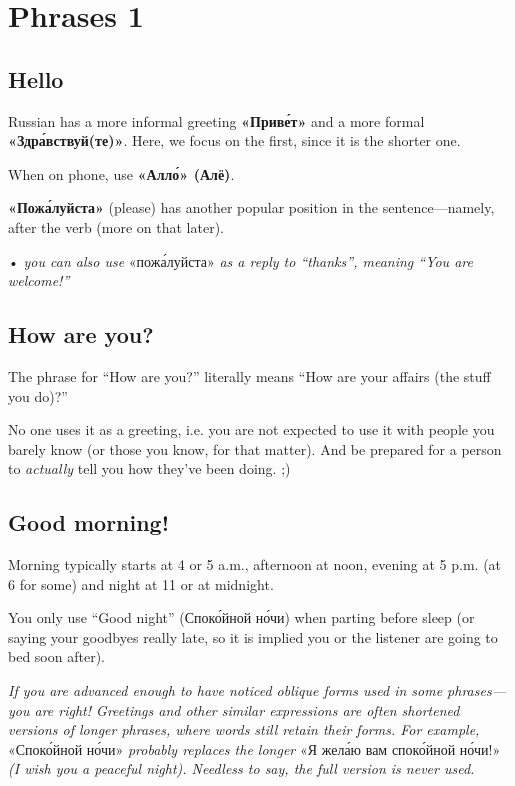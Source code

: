 \chapter{Phrases 1}\label{phrases-1}

\section{Hello}\label{hello}

Russian has a more informal greeting \textbf{«Прив\'{е}т»} and a more formal
\textbf{«Здр\'{а}вствуй(те)»}. Here, we focus on the first, since it is the
shorter one.

When on phone, use \textbf{«Алл\'{о}» (Алё)}.

\textbf{«Пож\'{а}луйста»} (please) has another popular position in the
sentence---namely, after the verb (more on that later).

• \emph{you can also use} «пож\'{а}луйста» \emph{as a reply to ``thanks'',
meaning ``You are welcome!''}

\section{How are you?}\label{how-are-you}

The phrase for ``How are you?'' literally means ``How are your affairs
(the stuff you do)?''

No one uses it as a greeting, i.e. you are not expected to use it with
people you barely know (or those you know, for that matter). And be
prepared for a person to \emph{actually} tell you how they've been
doing. ;)

\section{Good morning!}\label{good-morning}

Morning typically starts at 4 or 5 a.m., afternoon at noon, evening at 5
p.m. (at 6 for some) and night at 11 or at midnight.

You only use ``Good night'' (Спок\'{о}йной н\'{о}чи) when parting before sleep
(or saying your goodbyes really late, so it is implied you or the
listener are going to bed soon after).

\emph{If you are advanced enough to have noticed oblique forms used in
some phrases---you are right! Greetings and other similar expressions
are often shortened versions of longer phrases, where words still retain
their forms. For example,} «Спок\'{о}йной н\'{о}чи» \emph{probably replaces the
longer} «Я жел\'{а}ю вам спок\'{о}йной н\'{о}чи!» \emph{(I wish you a peaceful
night). Needless to say, the full version is never used.}
